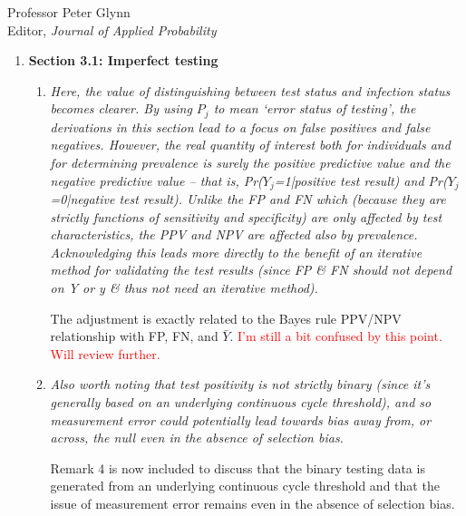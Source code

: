 \documentclass[11pt]{letter} %
\begin{document}
\begin{letter}{Professor
	Peter Glynn\\
	Editor, {\em Journal of Applied Probability}}
\begin{enumerate}
\begin{enumerate}
	\item {\it The “natural candidate for AIR” presented is the quantity that has more commonly been referred to as the “test positivity rate” (assuming that yi does in fact indicate test status rather than infection status which is obviously unknown). It would be helpful to mention this.}
	\vspace{5mm}

	This is now stated explicitly in Section 3, paragraph 2.
	\vspace{5mm}
\end{enumerate}
\item {\bf Section 3.1: Imperfect testing}
\begin{enumerate}
	\item {\it Here, the value of distinguishing between test status and infection status becomes clearer. By using $P_j$ to mean ‘error status of testing’, the derivations in this section lead to a focus on false positives and false negatives. However, the real quantity of interest both for individuals and for determining prevalence is surely the positive predictive value and the negative predictive value – that is, Pr($Y_j$=1|positive test result) and Pr($Y_j$=0|negative test result). Unlike the FP and FN which (because they are strictly functions of sensitivity and specificity) are only affected by test characteristics, the PPV and NPV are affected also by prevalence. Acknowledging this leads more directly to the benefit of an iterative method for validating the test results (since FP \& FN should not depend on Y or y \& thus not need an iterative method).}
	\vspace{5mm}

	The adjustment is exactly related to the Bayes rule PPV/NPV relationship with FP, FN, and $\bar Y$.
	\textcolor{red}{I'm still a bit confused by this point.  Will review further.}
	\vspace{5mm}
	\item {\it Also worth noting that test positivity is not strictly binary (since it’s generally based on an underlying continuous cycle threshold), and so measurement error could potentially lead towards bias away from, or across, the null even in the absence of selection bias.}
	\vspace{5mm}

	Remark 4 is now included to discuss that the binary testing data is generated from an underlying continuous cycle threshold and that the issue of measurement error remains even in the absence of selection bias.
	\vspace{5mm}


\end{enumerate}
\end{enumerate}
\end{letter}
\end{document}
